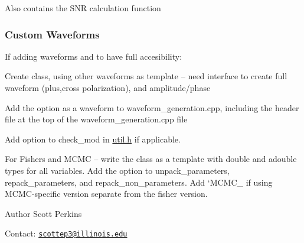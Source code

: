 Also contains the S\+NR calculation function\hypertarget{index_adding_waveforms}{}\subsubsection{Custom Waveforms}\label{index_adding_waveforms}
If adding waveforms and to have full accesibility\+:

Create class, using other waveforms as template -- need interface to create full waveform (plus,cross polarization), and amplitude/phase

Add the option as a waveform to waveform\+\_\+generation.\+cpp, including the header file at the top of the waveform\+\_\+generation.\+cpp file

Add option to check\+\_\+mod in \hyperlink{util_8h}{util.\+h} if applicable.

For Fishers and M\+C\+MC -- write the class as a template with double and adouble types for all variables. Add the option to unpack\+\_\+parameters, repack\+\_\+parameters, and repack\+\_\+non\+\_\+parameters. Add `\+M\+C\+M\+C\+\_\+\textquotesingle{}\textquotesingle{} if using M\+C\+M\+C-\/specific version separate from the fisher version.

\begin{DoxyAuthor}{Author}
Scott Perkins
\end{DoxyAuthor}
Contact\+: \href{mailto:scottep3@illinois.edu}{\tt scottep3@illinois.\+edu} 